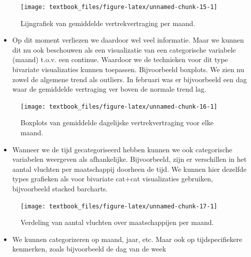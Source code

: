\documentclass[]{tufte-book}
\providecommand{\tightlist}{%
  \setlength{\itemsep}{0pt}\setlength{\parskip}{0pt}}
\begin{document}
\begin{figure}
\texttt{[image: textbook\_files/figure-latex/unnamed-chunk-15-1]} \caption[Lijngrafiek van gemiddelde vertrekvertraging per maand]{Lijngrafiek van gemiddelde vertrekvertraging per maand.}\label{fig:unnamed-chunk-15}
\end{figure}

\begin{itemize}
\tightlist
\item
  Op dit moment verliezen we daardoor wel veel informatie. Maar we kunnen dit nu ook beschouwen als een visualizatie van een categorische variabele (maand) t.o.v. een continue. Waardoor we de technieken voor dit type bivariate visualizaties kunnen toepassen. Bijvoorbeeld boxplots. We zien nu zowel de algemene trend als outliers. In februari was er bijvoorbeeld een dag waar de gemiddelde vertraging ver boven de normale trend lag.
\end{itemize}

\begin{figure}
\texttt{[image: textbook\_files/figure-latex/unnamed-chunk-16-1]} \caption[Boxplots van gemiddelde dagelijske vertrekvertraging voor elke maand]{Boxplots van gemiddelde dagelijske vertrekvertraging voor elke maand.}\label{fig:unnamed-chunk-16}
\end{figure}

\begin{itemize}
\tightlist
\item
  Wanneer we de tijd gecategoriseerd hebben kunnen we ook categorische variabelen weergeven als afhankelijke. Bijvoorbeeld, zijn er verschillen in het aantal vluchten per maatschappij doorheen de tijd. We kunnen hier dezelfde types grafieken als voor bivariate cat+cat visualizaties gebruiken, bijvoorbeeld stacked barcharts.
\end{itemize}

\begin{figure}
\texttt{[image: textbook\_files/figure-latex/unnamed-chunk-17-1]} \caption[Verdeling van aantal vluchten over maatschappijen per maand]{Verdeling van aantal vluchten over maatschappijen per maand.}\label{fig:unnamed-chunk-17}
\end{figure}

\begin{itemize}
\tightlist
\item
  We kunnen categorizeren op maand, jaar, etc. Maar ook op tijdspecifiekere kenmerken, zoals bijvoorbeeld de dag van de week
\end{itemize}
\end{document}
